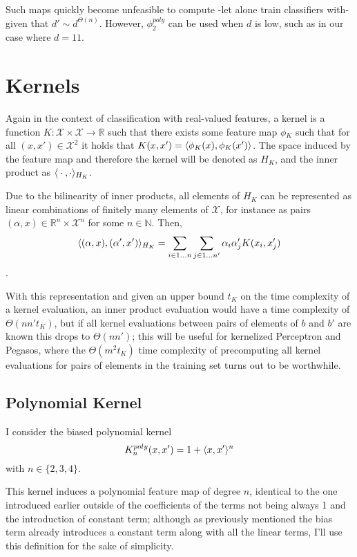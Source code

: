 Such maps quickly become unfeasible to compute -let alone train classifiers with- given that $d' \sim d^{\Theta{}(n)}$. However, $\phi^{poly}_2$ can be used when $d$ is low, such as in our case where $d = 11$.

\section{Kernels}
Again in the context of classification with real-valued features, a kernel is a function $K: \mathcal{X} \times \mathcal{X} \to \mathbb{R}$ such that there exists some feature map $\phi{}_K$ such that for all $(x, x') \in \mathcal{X}^2$ it holds that $K(x, x') = \langle{} \phi{}_K(x), \phi{}_K(x') \rangle{}$. The space induced by the feature map and therefore the kernel will be denoted as $H_{K}$, and the inner product as $\langle{} \cdot{}, \cdot{} \rangle{}_{H_K}$.

Due to the bilinearity of inner products, all elements of $H_K$ can be represented as linear combinations of finitely many elements of $\mathcal{X}$, for instance as pairs $(\alpha{}, x)\in \mathbb{R}^n \times{} \mathcal{X}^n$ for some $n \in \mathbb{N}$. Then, \[\langle{} (\alpha{}, x), (\alpha{}', x') \rangle{}_{H_K} = \sum_{i \in 1 \dots{} n}\sum_{j \in 1 \dots{} n'}{\alpha{}_i\alpha{}'_jK(x_i, x'_j)}\].

With this representation and given an upper bound $t_K$ on the time complexity of a kernel evaluation, an inner product evaluation would have a time complexity of $\Theta(nn't_K)$, but if all kernel evaluations between pairs of elements of $b$ and $b'$ are known this drops to $\Theta(nn')$; this will be useful for kernelized Perceptron and Pegasos, where the $\Theta(m^2t_K)$ time complexity of precomputing all kernel evaluations for pairs of elements in the training set turns out to be worthwhile.

\subsection{Polynomial Kernel}
I consider the biased polynomial kernel \[
K^{poly}_n(x, x') = 1 + \langle{} x, x' \rangle{}^n
\] with $n \in \{ 2, 3, 4 \}$. 

This kernel induces a polynomial feature map of degree $n$, identical to the one introduced earlier outside of the coefficients of the terms not being always 1 and the introduction of constant term; although as previously mentioned the bias term already introduces a constant term along with all the linear terms, I'll use this definition for the sake of simplicity.

